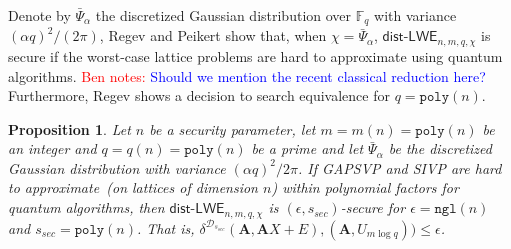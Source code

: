 \documentclass[11pt]{article}
\newcommand{\secref}[1]{\mbox{Section~\ref{#1}}}
\newcommand{\defref}[1]{\mbox{Definition~\ref{#1}}}
\newcommand{\class}[1]{{\ensuremath{\mathsf{#1}}}}
\newcommand{\vect}[1]{\ensuremath{\textbf{#1}}}
\newcommand{\Fq}{\ensuremath{\mathbb{F}_q}}
\newcommand{\unp}{\ensuremath{\mathtt{unp}}\xspace}
\newcommand{\poly}{\ensuremath{\mathtt{poly}}\xspace}
\newcommand{\ngl}{\ensuremath{\mathtt{ngl}}\xspace}
\newcommand{\lwe}{\class{LWE}}
\newcommand{\distLWE}{\ensuremath{\class{dist\mbox{-}LWE}}}
\newtheorem{proposition}[theorem]{Proposition}
\newcommand{\authnote}[2]{{\textcolor{red}{\textsf{#1 notes: }\textcolor{blue}{ #2}}\marginpar{\textcolor{red}{\textbf{!!!!!}}}}}
\newcommand{\authnote}[2]{}
\newcommand{\bnote}[1]{{\authnote{Ben}{#1}}}
\newcommand{\vA}{\vect{A}}
\newcommand{\vx}{\vect{x}}
\begin{document}
Denote by $\bar{\Psi}_\alpha$ the discretized Gaussian distribution over $\Fq$ with variance $(\alpha q)^2/(2\pi)$, Regev\cite{regev2005LWE} and Peikert \cite{peikert2009latticereduction} show that, when $\chi = \bar{\Psi}_{\alpha}$, $\class{dist}$-$\lwe_{n, m, q, \chi}$ is secure if the worst-case lattice problems are hard to approximate using quantum algorithms.
\bnote{Should we mention the recent classical reduction here?}
Furthermore, Regev \cite{regev2005LWE} shows a decision to search equivalence for $q=\poly(n)$.


\begin{proposition} 
\label{assume:entropy LWE}
Let $n$ be a security parameter, let $m = m(n) = \poly(n)$ be an integer and $q = q(n) = \poly(n)$ be a prime and let $\bar{\Psi}_\alpha$ be the discretized Gaussian distribution with variance $(\alpha q)^2/2\pi$.  If GAPSVP and SIVP are hard to approximate~(on lattices of dimension $n$) within polynomial factors for quantum algorithms, then $\distLWE_{n, m, q, \chi}$ is $(\epsilon, s_{sec})$-secure for $\epsilon = \ngl(n)$ and $s_{sec} = \poly(n)$.  That is, $\delta^{\mathcal{D}_{s_{sec}}}(\vA, \vA X+E ), (\vA, U_{m\log q}))\leq \epsilon$.

\end{proposition}
\end{document}
